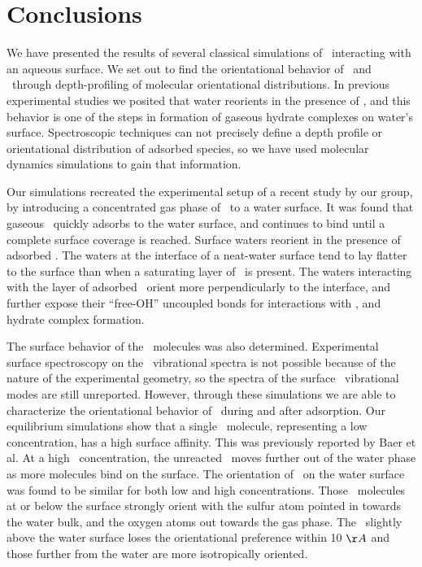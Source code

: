 \section {Conclusions}

We have presented the results of several classical simulations of \suldiox~interacting with an aqueous surface. We set out to find the orientational behavior of \wat~and \suldiox~through depth-profiling of molecular orientational distributions. In previous experimental studies we posited that water reorients in the presence of \suldiox, and this behavior is one of the steps in formation of gaseous hydrate complexes on water's surface. Spectroscopic techniques can not precisely define a depth profile or orientational distribution of adsorbed species, so we have used molecular dynamics simulations to gain that information.

Our simulations recreated the experimental setup of a recent study by our group,\cite{Ota2011} by introducing a concentrated gas phase of \suldiox~to a water surface. It was found that gaseous \suldiox~quickly adsorbs to the water surface, and continues to bind until a complete surface coverage is reached. Surface waters reorient in the presence of adsorbed \suldiox. The waters at the interface of a neat-water surface tend to lay flatter to the surface than when a saturating layer of \suldiox~is present. The waters interacting with the layer of adsorbed \suldiox~orient more perpendicularly to the interface, and further expose their ``free-OH'' uncoupled bonds for interactions with \suldiox, and hydrate complex formation.

The surface behavior of the \suldiox~molecules was also determined. Experimental surface spectroscopy on the \suldiox~vibrational spectra is not possible because of the nature of the experimental geometry, so the spectra of the surface \suldiox~vibrational modes are still unreported. However, through these simulations we are able to characterize the orientational behavior of \suldiox~during and after adsorption. Our equilibrium simulations show that a single \suldiox~molecule, representing a low concentration, has a high surface affinity. This was previously reported by Baer et al.\cite{Baer2010} At a high \suldiox~concentration, the unreacted \suldiox~moves further out of the water phase as more molecules bind on the surface. The orientation of \suldiox~on the water surface was found to be similar for both low and high concentrations. Those \suldiox~molecules at or below the surface strongly orient with the sulfur atom pointed in towards the water bulk, and the oxygen atoms out towards the gas phase. The \suldiox~slightly above the water surface loses the orientational preference within 10 $\AA$ and those further from the water are more isotropically oriented.

